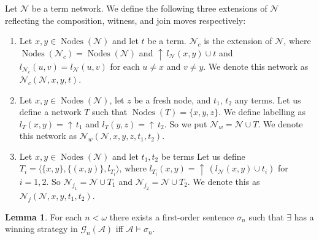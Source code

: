 \documentclass[a4paper]{article}
\theoremstyle{definition}
\theoremstyle{theorem}
\theoremstyle{proposition}
\theoremstyle{lemma}
\newtheorem{lemma}{Lemma}
\theoremstyle{ex}
\theoremstyle{corollary}
\theoremstyle{claim}
\newcommand{\up}[1]{\ensuremath{{\uparrow}\,#1}}
\begin{document}
Let $\mathcal{N}$ be a term network. We define the following three extensions of $\mathcal{N}$ reflecting the composition, witness, and join moves respectively:
\begin{enumerate}
  \item Let $x, y \in \operatorname{Nodes}(\mathcal{N})$ and let $t$ be a term. $\mathcal{N}_c$ is the extension of $\mathcal{N}$,
  where $\operatorname{Nodes}(\mathcal{N}_c) = \operatorname{Nodes}(\mathcal{N})$ and $\up{l_{\mathcal{N}}(x, y) \cup t}$ and $l_{\mathcal{N}_c}(u, v) = l_{\mathcal{N}}(u, v)$ for each $u \neq x$ and $v \neq y$. We denote this network as $\mathcal{N}_c(\mathcal{N}, x, y, t)$.
  \item
  Let $x, y \in \operatorname{Nodes}(\mathcal{N})$, let $z$ be a fresh node, and $t_1$, $t_2$ any terms. Let us define a network $T$ such that $\operatorname{Nodes}(T) = \{ x, y, z\}$. We define labelling as $l_{T}(x, y) = \up{t_1}$ and $l_{T}(y, z) = \up{t_2}$. So we put $\mathcal{N}_w = \mathcal{N} \cup T$.
  We denote this network as $\mathcal{N}_w(\mathcal{N}, x,y,z, t_1, t_2)$.
  \item Let $x, y \in \operatorname{Nodes}(\mathcal{N})$ and let $t_1, t_2$ be terms
  Let us define $T_i = \langle \{ x, y\}, \{ (x, y) \}, l_{T_i} \rangle$, where $l_{T_i}(x, y) = \up{(l_{\mathcal{N}}(x, y) \cup t_i)}$ for $i = 1,2$. So $\mathcal{N}_{j_1} = \mathcal{N} \cup T_1$ and $\mathcal{N}_{j_2} = \mathcal{N} \cup T_2$.
  We denote this as $\mathcal{N}_j(\mathcal{N}, x, y, t_1, t_2)$.
\end{enumerate}

\begin{lemma}\label{ax}
  For each $n < \omega$ there exists a first-order sentence $\sigma_n$ such that $\exists$ has a winning strategy in $\mathcal{G}_n(\mathcal{A})$ iff $\mathcal{A} \models \sigma_n$.
\end{lemma}
\end{document}
